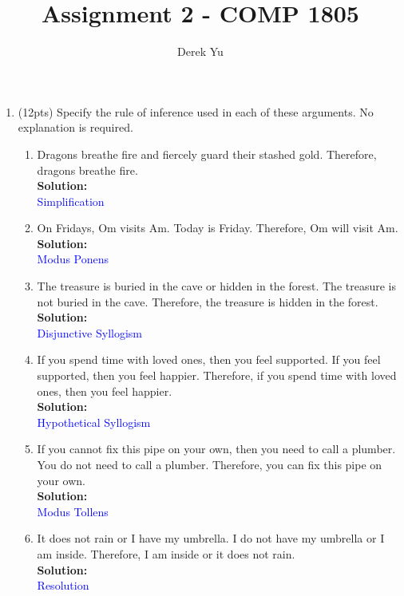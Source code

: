 \documentclass{article}
\newcommand{\sol}[1]{\textbf{Solution:\,}\textcolor{blue}{#1}}
\begin{document}

\title{Assignment 2 - COMP 1805}
\date{} %
\author{Derek Yu}
\maketitle
\thispagestyle{fancy}



\begin{enumerate}

\item(12pts) Specify the rule of inference used in each of these arguments. No explanation is required.

\begin{enumerate}
\item Dragons breathe fire and fiercely guard their stashed gold. Therefore, dragons breathe fire. 
\\\sol{
\\Simplification
}
\item On Fridays, Om visits Am. Today is Friday. Therefore, Om will visit Am.
\\\sol{
\\Modus Ponens
}
\item  The treasure is buried in the cave or hidden in the forest. The treasure is not buried in the cave. Therefore, the treasure is hidden in the forest.
\\\sol{
\\Disjunctive Syllogism
}
\item If you spend time with loved ones, then you feel supported. If you feel supported, then you feel happier. Therefore, if you spend time with loved ones, then you feel happier.
\\\sol{
\\Hypothetical Syllogism
}
\item If you cannot fix this pipe on your own, then you need to call a plumber. You do not need to call a plumber. Therefore, you can fix this pipe on your own.
\\\sol{
\\Modus Tollens
}
\item It does not rain or I have my umbrella. I do not have my umbrella or I am inside. Therefore, I am inside or it does not rain.
\\\sol{
\\Resolution
}
\end{enumerate}

\newpage


\end{enumerate}
\end{document}
